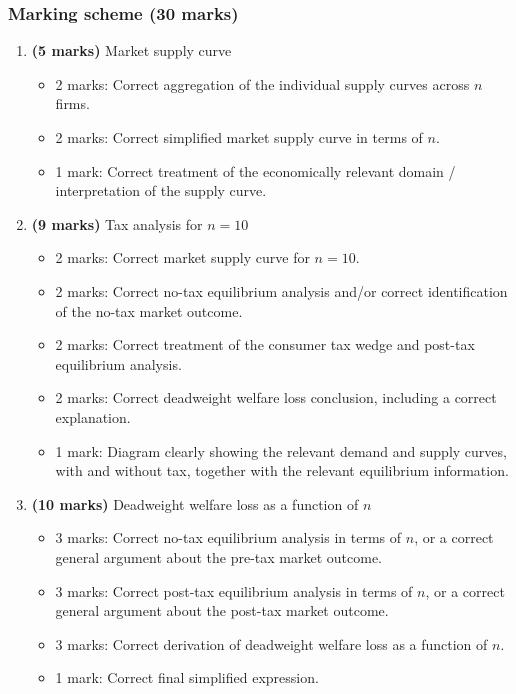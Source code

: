 \documentclass[12pt]{article}
\begin{document}
\newpage
\subsubsection{Marking scheme (30 marks)}

\begin{enumerate}[label=(\alph*)]
    \item \textbf{(5 marks)} Market supply curve
    \begin{itemize}
        \item 2 marks: Correct aggregation of the individual supply curves across \(n\) firms.
        \item 2 marks: Correct simplified market supply curve in terms of \(n\).
        \item 1 mark: Correct treatment of the economically relevant domain / interpretation of the supply curve.
    \end{itemize}

    \item \textbf{(9 marks)} Tax analysis for \(n=10\)
    \begin{itemize}
        \item 2 marks: Correct market supply curve for \(n=10\).
        \item 2 marks: Correct no-tax equilibrium analysis and/or correct identification of the no-tax market outcome.
        \item 2 marks: Correct treatment of the consumer tax wedge and post-tax equilibrium analysis.
        \item 2 marks: Correct deadweight welfare loss conclusion, including a correct explanation.
        \item 1 mark: Diagram clearly showing the relevant demand and supply curves, with and without tax, together with the relevant equilibrium information.
    \end{itemize}

    \item \textbf{(10 marks)} Deadweight welfare loss as a function of \(n\)
    \begin{itemize}
        \item 3 marks: Correct no-tax equilibrium analysis in terms of \(n\), or a correct general argument about the pre-tax market outcome.
        \item 3 marks: Correct post-tax equilibrium analysis in terms of \(n\), or a correct general argument about the post-tax market outcome.
        \item 3 marks: Correct derivation of deadweight welfare loss as a function of \(n\).
        \item 1 mark: Correct final simplified expression.
    \end{itemize}


\end{enumerate}
\end{document}
